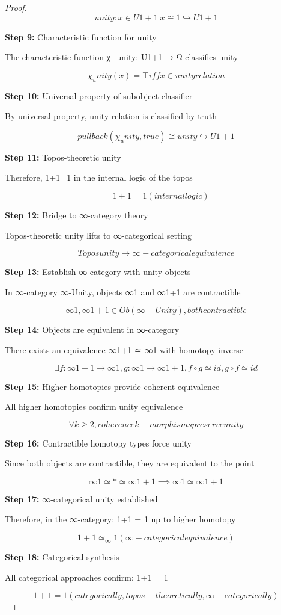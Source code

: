 \documentclass{article}
\begin{document}
\begin{proof}
\[unity: {x ∈ U1+1 | x ≅ 1} ↪ U1+1\]

\textbf{Step 9:} Characteristic function for unity

The characteristic function χ_unity: U1+1 → Ω classifies unity

\[χ_unity(x) = ⊤ iff x ∈ unity relation\]

\textbf{Step 10:} Universal property of subobject classifier

By universal property, unity relation is classified by truth

\[pullback(χ_unity, true) ≅ unity ↪ U1+1\]

\textbf{Step 11:} Topos-theoretic unity

Therefore, 1+1=1 in the internal logic of the topos

\[⊢ 1+1 = 1 (internal logic)\]

\textbf{Step 12:} Bridge to ∞-category theory

Topos-theoretic unity lifts to ∞-categorical setting

\[Topos unity → ∞-categorical equivalence\]

\textbf{Step 13:} Establish ∞-category with unity objects

In ∞-category ∞-Unity, objects ∞1 and ∞1+1 are contractible

\[∞1, ∞1+1 ∈ Ob(∞-Unity), both contractible\]

\textbf{Step 14:} Objects are equivalent in ∞-category

There exists an equivalence ∞1+1 ≃ ∞1 with homotopy inverse

\[∃ f: ∞1+1 → ∞1, g: ∞1 → ∞1+1, f∘g ≃ id, g∘f ≃ id\]

\textbf{Step 15:} Higher homotopies provide coherent equivalence

All higher homotopies confirm unity equivalence

\[∀k ≥ 2, coherence k-morphisms preserve unity\]

\textbf{Step 16:} Contractible homotopy types force unity

Since both objects are contractible, they are equivalent to the point

\[∞1 ≃ * ≃ ∞1+1 ⟹ ∞1 ≃ ∞1+1\]

\textbf{Step 17:} ∞-categorical unity established

Therefore, in the ∞-category: 1+1 = 1 up to higher homotopy

\[1+1 ≃_∞ 1 (∞-categorical equivalence)\]

\textbf{Step 18:} Categorical synthesis

All categorical approaches confirm: 1+1 = 1

\[1+1 = 1 (categorically, topos-theoretically, ∞-categorically)\]

\end{proof}
\end{document}
